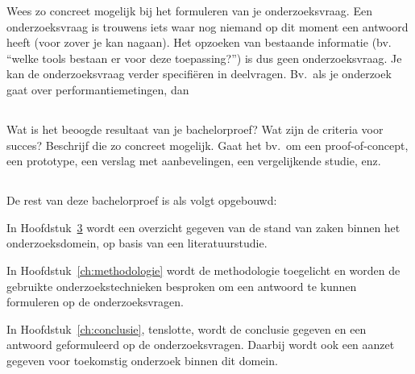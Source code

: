 Wees zo concreet mogelijk bij het formuleren van je onderzoeksvraag. Een onderzoeksvraag is trouwens iets waar nog niemand op dit moment een antwoord heeft (voor zover je kan nagaan). Het opzoeken van bestaande informatie (bv. ``welke tools bestaan er voor deze toepassing?'') is dus geen onderzoeksvraag. Je kan de onderzoeksvraag verder specifiëren in deelvragen. Bv.~als je onderzoek gaat over performantiemetingen, dan 

\section{}%
\label{sec:onderzoeksdoelstelling}

Wat is het beoogde resultaat van je bachelorproef? Wat zijn de criteria voor succes? Beschrijf die zo concreet mogelijk. Gaat het bv.\ om een proof-of-concept, een prototype, een verslag met aanbevelingen, een vergelijkende studie, enz.

\section{}%
\label{sec:opzet-bachelorproef}


De rest van deze bachelorproef is als volgt opgebouwd:

In Hoofdstuk~\ref{ch:stand-van-zaken} wordt een overzicht gegeven van de stand van zaken binnen het onderzoeksdomein, op basis van een literatuurstudie.

In Hoofdstuk~\ref{ch:methodologie} wordt de methodologie toegelicht en worden de gebruikte onderzoekstechnieken besproken om een antwoord te kunnen formuleren op de onderzoeksvragen.


In Hoofdstuk~\ref{ch:conclusie}, tenslotte, wordt de conclusie gegeven en een antwoord geformuleerd op de onderzoeksvragen. Daarbij wordt ook een aanzet gegeven voor toekomstig onderzoek binnen dit domein.

\chapter{}%
\label{ch:stand-van-zaken}

